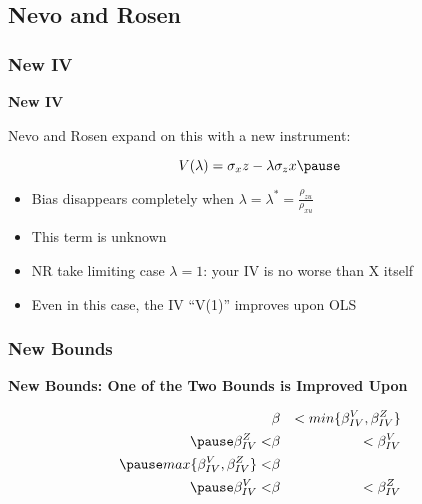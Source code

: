 \documentclass{beamer}
\begin{document}
\subsection{Nevo and Rosen}

\begin{frame}
\frametitle{New IV} 
\textbf{New IV} \\ \medskip \pause

Nevo and Rosen expand on this with a new instrument: \pause

\begin{equation*}
V(\lambda)=\sigma_{x}z-\lambda\sigma_{z}x \pause
\end{equation*}

\begin{itemize}
\item Bias disappears completely when $\lambda=\lambda^*=\frac{\rho_{zu}}{\rho_{xu}}$ \pause
\item This term is unknown \pause
\item NR take limiting case $\lambda=1$: your IV is no worse than X itself \pause
\item Even in this case, the IV ``V(1)'' improves upon OLS
\end{itemize}

\end{frame}

\begin{frame}
\frametitle{New Bounds}
\textbf{New Bounds: One of the Two Bounds is Improved Upon} \\ \medskip \pause

\setcounter{equation}{0}
\begin{eqnarray}
     &\beta&<min\{\beta_{IV}^V,\beta_{IV}^Z\} \\  \pause
     \beta_{IV}^Z<&\beta&<\beta_{IV}^V \\ \pause
     max\{\beta_{IV}^V,\beta_{IV}^Z\}<&\beta& \\ \pause
     \beta_{IV}^V<&\beta&<\beta_{IV}^Z
\end{eqnarray}

\end{frame}

\end{document}
